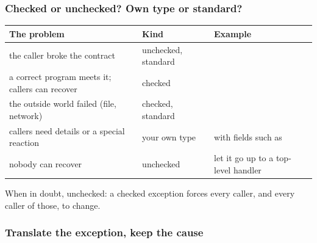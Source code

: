 \documentclass[aspectratio=169,10pt,compress]{beamer}
\begin{document}
\begin{frame}[t,fragile] \frametitle{Checked or unchecked? Own type or standard?}


\begin{table}
		\footnotesize
		\begin{tabular}{@{}L{0.40\textwidth}L{0.24\textwidth}L{0.28\textwidth}@{}}
			\toprule
			\textbf{The problem} & \textbf{Kind} & \textbf{Example} \\
			\midrule
			the caller broke the contract              & unchecked, standard &  \\
			a correct program meets it; callers can recover & checked          &  \\
			the outside world failed (file, network)    & checked, standard   &  \\
			callers need details or a special reaction  & your own type       & with fields such as  \\
			nobody can recover                          & unchecked           & let it go up to a top-level handler \\
			\bottomrule
		\end{tabular}
\end{table}%


	\vspace{0.3em}
	\small When in doubt, unchecked: a checked exception forces every caller, and every caller of those, to change.
\end{frame}








\begin{frame}[t,fragile] \frametitle{Translate the exception, keep the cause}
\end{frame}
\end{document}
